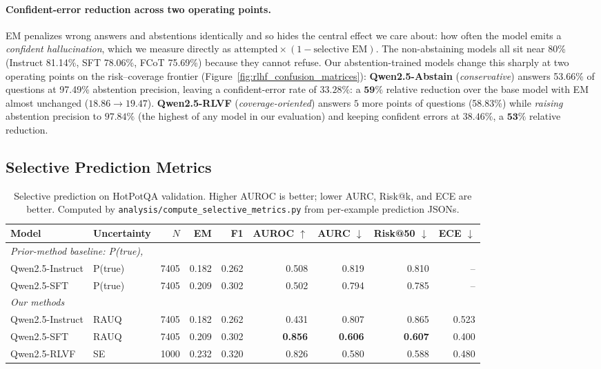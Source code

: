 \documentclass[11pt]{article}
\begin{document}
\paragraph{Confident-error reduction across two operating points.}
EM penalizes wrong answers and abstentions identically and so hides the central effect we care about: how often the model emits a \emph{confident hallucination}, which we measure directly as $\text{attempted} \times (1 - \text{selective EM})$. The non-abstaining models all sit near 80\% (Instruct 81.14\%, SFT 78.06\%, FCoT 75.69\%) because they cannot refuse. Our abstention-trained models change this sharply at two operating points on the risk--coverage frontier (Figure~\ref{fig:rlhf_confusion_matrices}): \textbf{Qwen2.5-Abstain} (\emph{conservative}) answers 53.66\% of questions at 97.49\% abstention precision, leaving a confident-error rate of $\mathbf{33.28\%}$: a $\mathbf{59\%}$ relative reduction over the base model with EM almost unchanged ($18.86 \to 19.47$). \textbf{Qwen2.5-RLVF} (\emph{coverage-oriented}) answers $5$ more points of questions (58.83\%) while \emph{raising} abstention precision to $\mathbf{97.84\%}$ (the highest of any model in our evaluation) and keeping confident errors at $\mathbf{38.46\%}$, a $\mathbf{53\%}$ relative reduction.

\subsection{Selective Prediction Metrics}\label{sec:results-selective}

\begin{table}[t]
\centering
\caption{Selective prediction on HotPotQA validation. Higher AUROC is better; lower AURC, Risk@k, and ECE are better. Computed by \texttt{analysis/compute\_selective\_metrics.py} from per-example prediction JSONs.}
\label{tab:selective-metrics}
\begin{tabular}{llrrrrrrr}
\toprule
\textbf{Model} & \textbf{Uncertainty} & $N$ & EM & F1 & AUROC $\uparrow$ & AURC $\downarrow$ & Risk@50 $\downarrow$ & ECE $\downarrow$ \\
\midrule
\multicolumn{9}{l}{\emph{Prior-method baseline: P(true), \citealp{kadavath2022language}}} \\
\cmidrule(lr){1-9}
Qwen2.5-Instruct & P(true) & 7405 & 0.182 & 0.262 & 0.508 & 0.819 & 0.810 & -- \\
Qwen2.5-SFT      & P(true) & 7405 & 0.209 & 0.302 & 0.502 & 0.794 & 0.785 & -- \\
\midrule
\multicolumn{9}{l}{\emph{Our methods}} \\
\cmidrule(lr){1-9}
Qwen2.5-Instruct & RAUQ    & 7405 & 0.182 & 0.262 & 0.431 & 0.807 & 0.865 & 0.523 \\
Qwen2.5-SFT      & RAUQ    & 7405 & 0.209 & 0.302 & \textbf{0.856} & \textbf{0.606} & \textbf{0.607} & 0.400 \\
Qwen2.5-RLVF     & SE      & 1000 & 0.232 & 0.320 & 0.826 & 0.580 & 0.588 & 0.480 \\
\bottomrule
\end{tabular}
\end{table}
\end{document}

